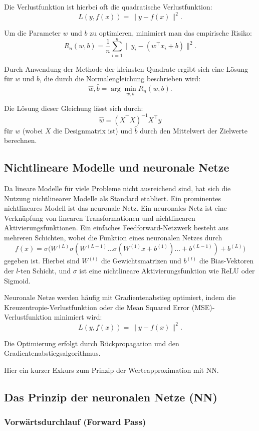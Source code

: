 Die Verlustfunktion ist hierbei oft die quadratische Verlustfunktion:
\[
L(y, f(x)) = \|y - f(x)\|^2.
\]

Um die Parameter $w$ und $b$ zu optimieren, minimiert man das empirische Risiko:
\[
R_n(w, b) = \frac{1}{n} \sum_{i=1}^n \|y_i - (w^\top x_i + b)\|^2.
\]

Durch Anwendung der Methode der kleinsten Quadrate ergibt sich eine Lösung für $w$ und $b$, die durch die Normalengleichung beschrieben wird:
\[
\hat{w}, \hat{b} = \arg \min_{w, b} R_n(w, b).
\]

Die Lösung dieser Gleichung lässt sich durch:
\[
\hat{w} = (X^\top X)^{-1} X^\top y
\]
für $w$ (wobei $X$ die Designmatrix ist) und $\hat{b}$ durch den Mittelwert der Zielwerte berechnen.

\subsection{Nichtlineare Modelle und neuronale Netze}
Da lineare Modelle für viele Probleme nicht ausreichend sind, hat sich die Nutzung nichtlinearer Modelle als Standard etabliert. Ein prominentes nichtlineares Modell ist das neuronale Netz. Ein neuronales Netz ist eine Verknüpfung von linearen Transformationen und nichtlinearen Aktivierungsfunktionen. Ein einfaches Feedforward-Netzwerk besteht aus mehreren Schichten, wobei die Funktion eines neuronalen Netzes durch
\[
f(x) = \sigma\big(W^{(L)} \sigma(W^{(L-1)} \dots \sigma(W^{(1)} x + b^{(1)}) \dots + b^{(L-1)}) + b^{(L)}\big)
\]
gegeben ist. Hierbei sind $W^{(l)}$ die Gewichtsmatrizen und $b^{(l)}$ die Bias-Vektoren der $l$-ten Schicht, und $\sigma$ ist eine nichtlineare Aktivierungsfunktion wie ReLU oder Sigmoid.

Neuronale Netze werden häufig mit Gradientenabstieg optimiert, indem die Kreuzentropie-Verlustfunktion oder die Mean Squared Error (MSE)-Verlustfunktion minimiert wird:
\[
L(y, f(x)) = \|y - f(x)\|^2.
\]

Die Optimierung erfolgt durch Rückpropagation und den Gradientenabstiegsalgorithmus.

Hier ein kurzer Exkurs zum Prinzip der Werteapproximation mit NN.


\subsection{Das Prinzip der neuronalen Netze (NN)}

\subsubsection{Vorwärtsdurchlauf (Forward Pass)}

